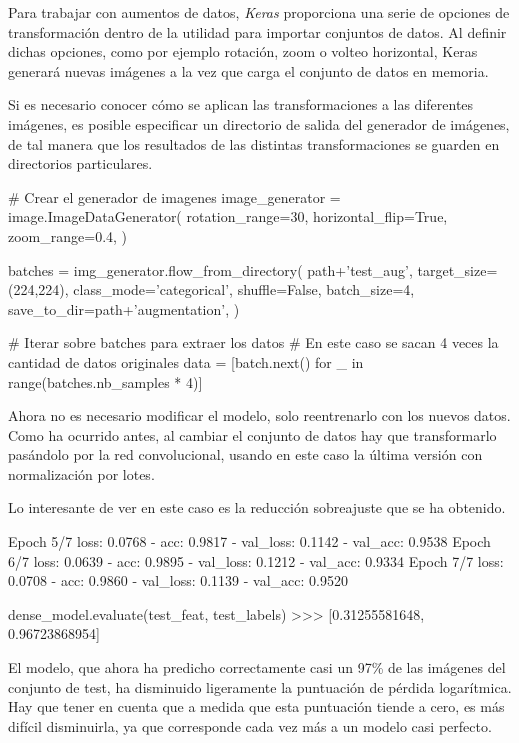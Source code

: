 Para trabajar con aumentos de datos, \textit{Keras} proporciona una serie de opciones de transformación dentro de la utilidad para importar conjuntos de datos. Al definir dichas opciones, como por ejemplo rotación, zoom o volteo horizontal, Keras generará nuevas imágenes a la vez que carga el conjunto de datos en memoria.

Si es necesario conocer cómo se aplican las transformaciones a las diferentes imágenes, es posible especificar un directorio de salida del generador de imágenes, de tal manera que los resultados de las distintas transformaciones se guarden en directorios particulares.

\begin{python}
# Crear el generador de imagenes
image_generator = image.ImageDataGenerator(
    rotation_range=30,
    horizontal_flip=True,
    zoom_range=0.4,
)

batches = img_generator.flow_from_directory(
    path+'test_aug',
    target_size=(224,224),
    class_mode='categorical',
    shuffle=False,
    batch_size=4,
    save_to_dir=path+'augmentation',
)

# Iterar sobre batches para extraer los datos
# En este caso se sacan 4 veces la cantidad de datos originales
data = [batch.next() for _ in range(batches.nb_samples * 4)]
\end{python}

Ahora no es necesario modificar el modelo, solo reentrenarlo con los nuevos datos. Como ha ocurrido antes, al cambiar el conjunto de datos hay que transformarlo pasándolo por la red convolucional, usando en este caso la última versión con normalización por lotes.

Lo interesante de ver en este caso es la reducción sobreajuste que se ha obtenido.

\begin{python}
Epoch 5/7
loss: 0.0768 - acc: 0.9817 - val_loss: 0.1142 - val_acc: 0.9538
Epoch 6/7
loss: 0.0639 - acc: 0.9895 - val_loss: 0.1212 - val_acc: 0.9334
Epoch 7/7
loss: 0.0708 - acc: 0.9860 - val_loss: 0.1139 - val_acc: 0.9520

dense_model.evaluate(test_feat, test_labels)
>>> [0.31255581648, 0.96723868954]
\end{python}

El modelo, que ahora ha predicho correctamente casi un 97\% de las imágenes del conjunto de test, ha disminuido ligeramente la puntuación de pérdida logarítmica. Hay que tener en cuenta que a medida que esta puntuación tiende a cero, es más difícil disminuirla, ya que corresponde cada vez más a un modelo casi perfecto.

